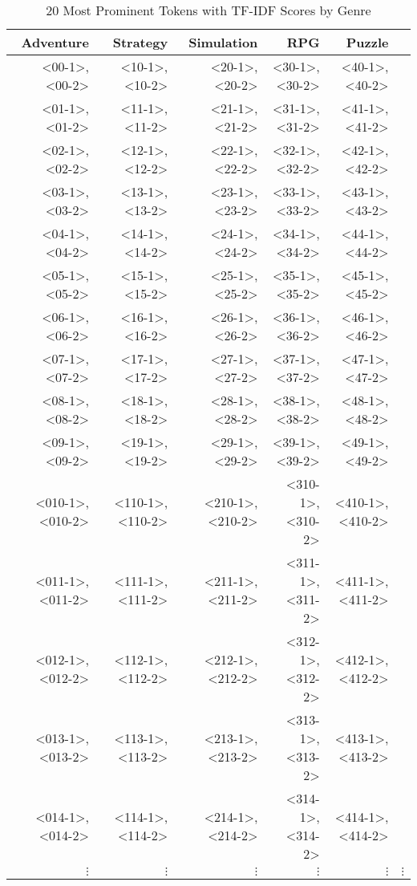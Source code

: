 \begin{table}[h]
    \centering
    \begin{tabular}{r|r|r|r|r|r}
        Adventure & Strategy & Simulation & RPG & Puzzle \\
        \hline
        <00-1>,  <00-2>  & <10-1>,  <10-2>  & <20-1>,  <20-2>  & <30-1>,  <30-2>  & <40-1>,  <40-2>  \\
        <01-1>,  <01-2>  & <11-1>,  <11-2>  & <21-1>,  <21-2>  & <31-1>,  <31-2>  & <41-1>,  <41-2>  \\
        <02-1>,  <02-2>  & <12-1>,  <12-2>  & <22-1>,  <22-2>  & <32-1>,  <32-2>  & <42-1>,  <42-2>  \\
        <03-1>,  <03-2>  & <13-1>,  <13-2>  & <23-1>,  <23-2>  & <33-1>,  <33-2>  & <43-1>,  <43-2>  \\
        <04-1>,  <04-2>  & <14-1>,  <14-2>  & <24-1>,  <24-2>  & <34-1>,  <34-2>  & <44-1>,  <44-2>  \\
        <05-1>,  <05-2>  & <15-1>,  <15-2>  & <25-1>,  <25-2>  & <35-1>,  <35-2>  & <45-1>,  <45-2>  \\
        <06-1>,  <06-2>  & <16-1>,  <16-2>  & <26-1>,  <26-2>  & <36-1>,  <36-2>  & <46-1>,  <46-2>  \\
        <07-1>,  <07-2>  & <17-1>,  <17-2>  & <27-1>,  <27-2>  & <37-1>,  <37-2>  & <47-1>,  <47-2>  \\
        <08-1>,  <08-2>  & <18-1>,  <18-2>  & <28-1>,  <28-2>  & <38-1>,  <38-2>  & <48-1>,  <48-2>  \\
        <09-1>,  <09-2>  & <19-1>,  <19-2>  & <29-1>,  <29-2>  & <39-1>,  <39-2>  & <49-1>,  <49-2>  \\
        <010-1>, <010-2> & <110-1>, <110-2> & <210-1>, <210-2> & <310-1>, <310-2> & <410-1>, <410-2> \\
        <011-1>, <011-2> & <111-1>, <111-2> & <211-1>, <211-2> & <311-1>, <311-2> & <411-1>, <411-2> \\
        <012-1>, <012-2> & <112-1>, <112-2> & <212-1>, <212-2> & <312-1>, <312-2> & <412-1>, <412-2> \\
        <013-1>, <013-2> & <113-1>, <113-2> & <213-1>, <213-2> & <313-1>, <313-2> & <413-1>, <413-2> \\
        <014-1>, <014-2> & <114-1>, <114-2> & <214-1>, <214-2> & <314-1>, <314-2> & <414-1>, <414-2> \\
        $\vdots$ & $\vdots$ & $\vdots$ & $\vdots$ & $\vdots$ & $\vdots$
    \end{tabular}
    \caption{20 Most Prominent Tokens with TF-IDF Scores by Genre}
    \label{tab:top_tokens_by_genre}
\end{table}